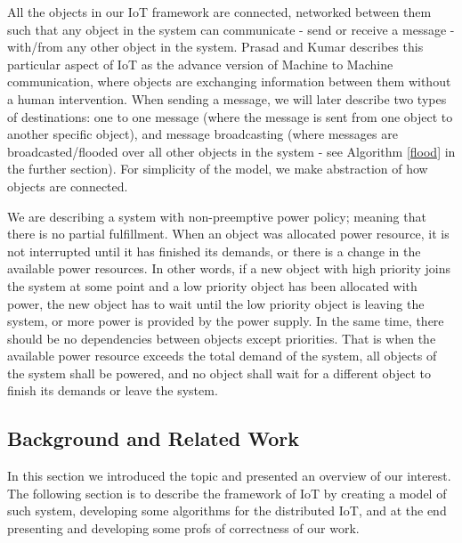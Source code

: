 \documentclass[../main/IoT.tex]{subfiles}
\begin{document}
All the objects in our IoT framework are connected, networked between them such that any object in the system can communicate - send or receive a message - with/from any other object in the system. Prasad and Kumar \cite{prasad2012energy} describes this particular aspect of IoT as the advance version of Machine to Machine communication, where objects are exchanging information between them without a human intervention. When sending a message, we will later describe two types of destinations: one to one message (where the message is sent from one object to another specific object), and message broadcasting (where messages are broadcasted/flooded over all other objects in the system - see Algorithm \ref{flood} in the further section). For simplicity of the model, we make abstraction of how objects are connected.

We are describing a system with non-preemptive power policy; meaning that there is no partial fulfillment. When an object was allocated power resource, it is not interrupted until it has finished its demands, or there is a change in the available power resources. In other words, if a new object with high priority joins the system at some point and a low priority object has been allocated with power, the new object has to wait until the low priority object is leaving the system, or more power is provided by the power supply. In the same time, there should be no dependencies between objects except priorities. That is when the available power resource exceeds the total demand of the system, all objects of the system shall be powered, and no object shall wait for a different object to finish its demands or leave the system.

\subsection{Background and Related Work}

In this section we introduced the topic and presented an overview of our interest. The following section is to describe the framework of IoT by creating a model of such system, developing some algorithms for the distributed IoT, and at the end presenting and developing some profs of correctness of our work.
\end{document}
